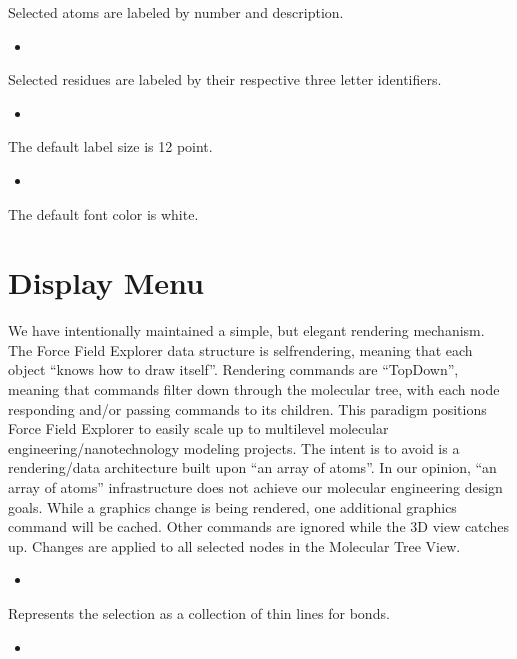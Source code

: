 \documentclass[letterpaper,11pt,english]{sphinxmanual}
\begin{document}
Selected atoms are labeled by number and description.
\begin{itemize}
\item {} 

\end{itemize}

Selected residues are labeled by their respective three letter identifiers.
\begin{itemize}
\item {} 

\end{itemize}

The default label size is 12 point.
\begin{itemize}
\item {} 

\end{itemize}

The default font color is white.


\section{Display Menu}
\label{\detokenize{text/menus:display-menu}}
We have intentionally maintained a simple, but elegant rendering mechanism. The Force Field Explorer data structure is self\sphinxhyphen{}rendering, meaning that each object “knows how to draw itself”. Rendering commands are “Top\sphinxhyphen{}Down”, meaning that commands filter down through the molecular tree, with each node responding and/or passing commands to its children. This paradigm positions Force Field Explorer to easily scale up to multi\sphinxhyphen{}level molecular engineering/nanotechnology modeling projects. The intent is to avoid is a rendering/data architecture built upon “an array of atoms”. In our opinion, “an array of atoms” infrastructure does not achieve our molecular engineering design goals. While a graphics change is being rendered, one additional graphics command will be cached. Other commands are ignored while the 3D view catches up. Changes are applied to all selected nodes in the Molecular Tree View.
\begin{itemize}
\item {} 

\end{itemize}

Represents the selection as a collection of thin lines for bonds.
\begin{itemize}
\item {} 

\end{itemize}
\end{document}
